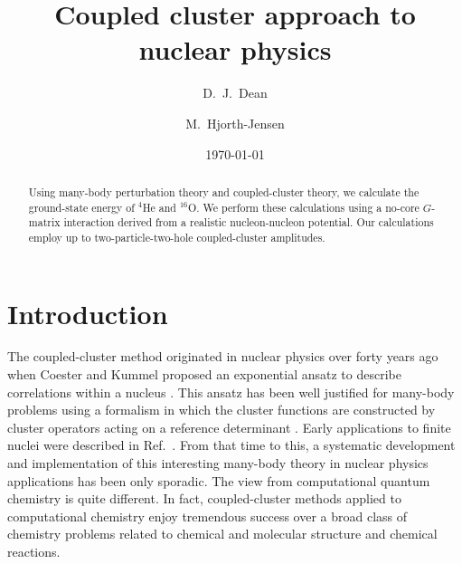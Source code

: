 \documentclass[aps,prc,twocolumn,floatfix]{revtex4}
\begin{document}
\title{Coupled cluster approach to nuclear physics}
\author{D.~J.~Dean}
\author{M.~Hjorth-Jensen}
\date{\today}
\begin{abstract}
Using many-body perturbation theory and 
coupled-cluster theory, we calculate the ground-state
energy of $^{4}$He and $^{16}$O. We perform these calculations 
using a no-core $G$-matrix interaction derived from a realistic 
nucleon-nucleon potential. Our calculations employ 
up to two-particle-two-hole coupled-cluster amplitudes.
\end{abstract}

\maketitle

\section{Introduction}
\label{sec:introduction}

The coupled-cluster method originated in nuclear physics over
forty years ago when Coester and Kummel proposed an exponential ansatz 
to describe correlations within a nucleus 
\cite{coester58,coester60}. This ansatz has been well justified
for many-body problems using a formalism in which the
cluster functions are constructed by cluster operators acting on 
a reference determinant \cite{harris92}. Early applications 
to finite nuclei were described in Ref.~\cite{kum78}. 
From that
time to this, a systematic development and implementation 
of this interesting many-body theory in nuclear 
physics applications has been only sporadic. The view from 
computational quantum chemistry is quite different. 
In fact, coupled-cluster methods applied to computational chemistry 
enjoy tremendous success 
\cite{bartlett81,comp_chem_rev00,piotr1,helgaker,arponen97,lindgren} 
over a broad class of
chemistry problems related to chemical and 
molecular structure and chemical reactions. 
\end{document}
